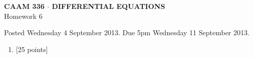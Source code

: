 \documentclass[10pt]{article}
\begin{document}
\vspace*{-5em}
\begin{center}
\large \textsf{\textbf{CAAM 336 $\cdot$ DIFFERENTIAL EQUATIONS}\\[0.5em]
Homework 6 }
\end{center}

Posted Wednesday 4 September 2013.  Due 5pm Wednesday 11 September 2013.

\begin{enumerate}\addtocounter{enumi}{5}
\item {[25 points]}\\  

\end{enumerate}
\end{document}
